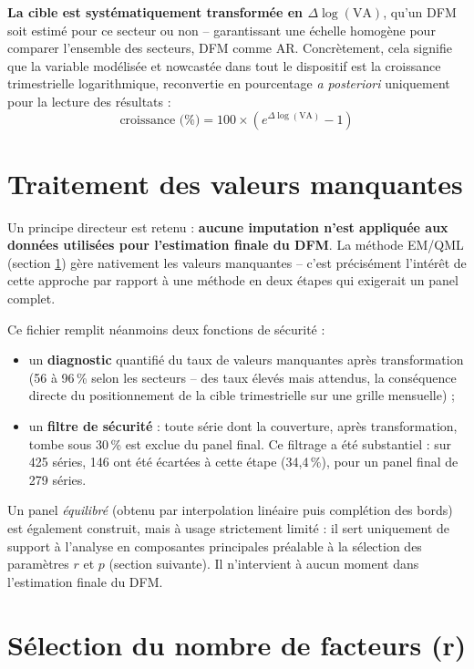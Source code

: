 \documentclass[11pt,a4paper]{report}
\newcommand{\dlogva}{$\Delta\log(\mathrm{VA})$}
\begin{document}
\textbf{La cible est systématiquement transformée en \dlogva{}}, qu'un DFM soit estimé pour ce secteur ou non -- garantissant une échelle homogène pour comparer l'ensemble des secteurs, DFM comme AR. Concrètement, cela signifie que la variable modélisée et nowcastée dans tout le dispositif est la croissance trimestrielle logarithmique, reconvertie en pourcentage \emph{a posteriori} uniquement pour la lecture des résultats :
\begin{equation}
  \text{croissance (\%)} = 100 \times \left( e^{\Delta\log(\mathrm{VA})} - 1 \right)
  \label{eq:conversion}
\end{equation}

\section{Traitement des valeurs manquantes}
\label{sec:missing}

Un principe directeur est retenu : \textbf{aucune imputation n'est appliquée aux données utilisées pour l'estimation finale du DFM}. La méthode EM/QML (section \ref{sec:missing}) gère nativement les valeurs manquantes -- c'est précisément l'intérêt de cette approche par rapport à une méthode en deux étapes qui exigerait un panel complet.

Ce fichier remplit néanmoins deux fonctions de sécurité :
\begin{itemize}[nosep]
  \item un \textbf{diagnostic} quantifié du taux de valeurs manquantes après transformation (56 à 96\,\% selon les secteurs -- des taux élevés mais attendus, la conséquence directe du positionnement de la cible trimestrielle sur une grille mensuelle) ;
  \item un \textbf{filtre de sécurité} : toute série dont la couverture, après transformation, tombe sous 30\,\% est exclue du panel final. Ce filtrage a été substantiel : sur 425 séries, 146 ont été écartées à cette étape (34,4\,\%), pour un panel final de 279 séries.
\end{itemize}

Un panel \emph{équilibré} (obtenu par interpolation linéaire puis complétion des bords) est également construit, mais à usage strictement limité : il sert uniquement de support à l'analyse en composantes principales préalable à la sélection des paramètres $r$ et $p$ (section suivante). Il n'intervient à aucun moment dans l'estimation finale du DFM.

\section{Sélection du nombre de facteurs (r)}
\end{document}
